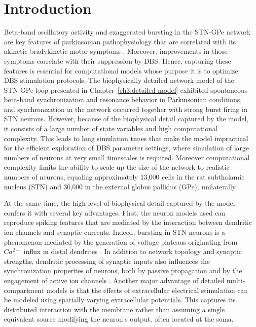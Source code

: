 %
%
%
%
%

%
%

%
%
%
\section{Introduction}
%

%
%
%
%
%
%
%
%
%

Beta-band oscillatory activity and exaggerated bursting in the STN-GPe network
are key features of parkinsonian pathophysiology that are correlated with its
akinetic-bradykinetic motor symptoms \cite{sharott_dopamine_2005,mallet_disrupted_2008,kuhn_high-frequency_2008,sanders_parkinsonism-related_2013,sharott_activity_2014}. Moreover, improvements in those symptoms correlate
with their suppression by DBS. Hence, capturing these features is essential
for computational models whose purpose it is to optimize DBS stimulation protocols.
The biophysically detailed network model of the STN-GPe loop presented in
Chapter~\ref{ch3:detailed-model} exhibited spontaneous beta-band synchronization and
resonance behavior in Parkinsonian conditions, and synchronization in the network
occurred together with strong burst firing in STN neurons. However, because of
the biophysical detail captured by the model, it consists of a large number of
state variables and high computational complexity.
This leads to long simulation times that make the model impractical
for the efficient exploration of DBS parameter settings, where simulation of large
numbers of neurons at very small timescales is required.
%
%
%
%
%
%
%
Moreover computational complexity limits the ability to scale up
the size of the network to realistic numbers of neurons, equaling approximately
13,000 cells in the rat subthalamic nucleus (STN) and 30,000 in the external
globus pallidus (GPe), unilaterally \cite{oorschot_absolute_1999,abdi_prototypic_2015}.

At the same time, the high level of biophysical detail captured by the model
confers it with several key advantages. First, the neuron models used
can reproduce spiking features that are mediated by the interaction between
dendritic ion channels and synaptic currents. Indeed, bursting in STN neurons
is a phenomenon mediated by the generation of  voltage plateaus originating
from $Ca^{2+}$ influx in distal dendrites \cite{gillies_membrane_2005}.
In addition to network topology and synaptic strengths, dendritic processing
of synaptic inputs also influences the synchronization properties of neurons,
both by passive propagation and by the engagement of active ion channels
\cite{schultheiss_phase_2010,goldberg_response_2007}.
%
Another major advantage of detailed multi-compartment models is that the effects of
extracellular electrical stimulation can be modeled using spatially varying
extracellular potentials. This captures its distributed interaction with the
membrane rather than assuming a single equivalent source modifying the neuron's output,
often located at the soma.
%


